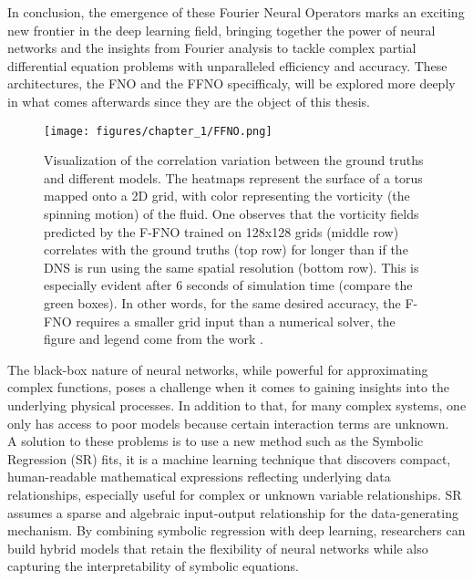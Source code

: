 \newpage

In conclusion, the emergence of these Fourier Neural Operators marks an exciting new frontier in the deep learning field, bringing together the power of neural networks and the insights from Fourier analysis to tackle complex partial differential equation problems with unparalleled efficiency and accuracy. These architectures, the FNO and the FFNO specifficaly, will be explored more deeply in what comes afterwards since they are the object of this thesis.

\begin{figure}[!b]
    \centering
    \texttt{[image: figures/chapter\_1/FFNO.png]}
    \caption{Visualization of the correlation variation between the ground truths and different models. The heatmaps represent the surface of a torus mapped onto a 2D grid, with color representing the vorticity (the spinning motion) of the fluid. One observes that the vorticity fields predicted by the F-FNO trained on 128x128 grids (middle row) correlates with the ground truths (top row) for longer than if the DNS is run using the same spatial resolution (bottom row). This is especially evident after 6 seconds of simulation time (compare the green boxes). In other words, for the same desired accuracy, the F-FNO requires a smaller grid input than a numerical solver, the figure and legend come from the work \cite{FFNO}.}
    \label{C1 - FIG - FFNO}
\end{figure}

\newpage

The black-box nature of neural networks, while powerful for approximating complex functions, poses a challenge when it comes to gaining insights into the underlying physical processes. In addition to that, for many complex systems, one only has access to poor models because certain interaction terms are unknown.\\

A solution to these problems is to use a new method such as the Symbolic Regression (SR) fits, it is a machine learning technique that discovers compact, human-readable mathematical expressions reflecting underlying data relationships, especially useful for complex or unknown variable relationships. SR assumes a sparse and algebraic input-output relationship for the data-generating mechanism. By combining symbolic regression with deep learning, researchers can build hybrid models that retain the flexibility of neural networks while also capturing the interpretability of symbolic equations.\\

